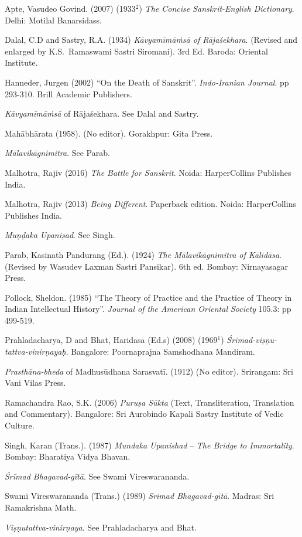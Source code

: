 \begin{thebibliography}{99}
\itemsep=2pt
Apte, Vasudeo Govind. (2007) (1933$^{2}$) \textsl{The Concise Sanskrit-English Dictionary}. Delhi: Motilal Banarsidass.

Dalal, C.D and Sastry, R.A. (1934) \textsl{Kāvyamīmāṁsā of Rājaśekhara}. (Revised and enlarged by K.S.~Ramaswami Sastri Siromani). 3rd Ed. Baroda: Oriental Institute.

Hanneder, Jurgen (2002) ``On the Death of Sanskrit''. \textsl{Indo-Iranian Journal}. pp 293-310. Brill Academic Publishers. 

\textsl{Kāvyamīmāṁsā} of Rājaśekhara. See Dalal and Sastry. 


Mahābhārata (1958). (No editor). Gorakhpur: Gita Press.

\textsl{Mālavikāgnimitra}. See Parab. 

Malhotra, Rajiv (2016) \textsl{The Battle for Sanskrit}. Noida: HarperCollins Publishes India.

Malhotra, Rajiv (2013) \textsl{Being Different}. Paperback edition. Noida: HarperCollins Publishes India.

\textsl{Muṇḍaka Upaniṣad}. See Singh. 

Parab, Kasinath Pandurang (Ed.). (1924) \textsl{The Mālavikāgnimitra of Kālidāsa}. (Revised by Wasudev Laxman Sastri Pansikar). 6th ed. Bombay: Nirnayasagar Press.

Pollock, Sheldon. (1985) ``The Theory of Practice and the Practice of Theory in Indian Intellectual History''. \textsl{Journal of the American Oriental Society} 105.3: pp 499-519.

Prahladacharya, D and Bhat, Haridasa (Ed.s) (2008) (1969$^{1}$) \textsl{Śrimad-viṣṇu-tattva-vinirṇayaḥ}. Bangalore: Poornaprajna Samshodhana Mandiram.

{\it Prasthāna-bheda} of Madhusūdhana Sarasvatī. (1912) (No editor). Srirangam: Sri Vani Vilas Press.

Ramachandra Rao, S.K. (2006) \textsl{Puruṣa Sūkta} (Text, Transliteration, Translation and Commentary). Bangalore: Sri Aurobindo Kapali Sastry Institute of Vedic Culture. 

Singh, Karan (Trans.). (1987) \textsl{Mundaka Upanishad} -- \textsl{The Bridge to Immortality}. Bombay: Bharatiya Vidya Bhavan.

\textsl{Śrīmad Bhagavad-gītā}. See Swami Vireswarananda. 

Swami Vireswarananda (Trans.) (1989) \textsl{Srimad Bhagavad-gītā}. Madras: Sri Ramakrishna Math.

\textsl{Viṣṇutattva-vinirṇaya}. See Prahladacharya and Bhat.
\end{thebibliography}
\label{chapter\thechapter:end}
